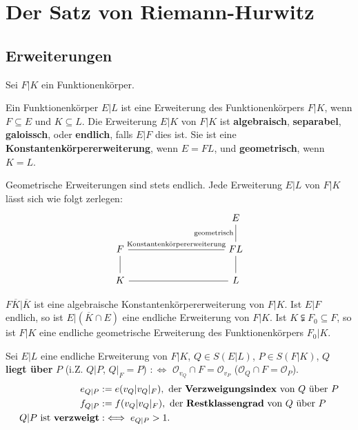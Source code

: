 \chapter{Der Satz von Riemann-Hurwitz}

\section{Erweiterungen}
Sei $F|K$ ein Funktionenkörper.

\begin{definition}
    Ein Funktionenkörper $E|L$ ist eine Erweiterung des Funktionenkörpers $F|K$, wenn $F \subseteq E$ und $K \subseteq L$.
    Die Erweiterung $E|K$ von $F|K$ ist \textbf{algebraisch}, \textbf{separabel}, \textbf{galoissch}, oder \textbf{endlich}, falls
    $E|F$ dies ist. Sie ist eine \textbf{Konstantenkörpererweiterung}, wenn $E = FL$, und \textbf{geometrisch}, wenn $K=L$.
\end{definition}

\begin{bemerkungnr}
    Geometrische Erweiterungen sind stets endlich. Jede Erweiterung $E|L$ von $F|K$ lässt sich wie folgt zerlegen:
    $$\begin{tikzcd}[column sep=10em]
          & E\\
        F \rar[dash]{\text{Konstantenkörpererweiterung}} & FL \uar[dash]{\text{geometrisch}}\\
        K \rar[dash] \uar[dash] & L \uar[dash]
    \end{tikzcd}$$
\end{bemerkungnr}

\begin{beispiel}
    $F\overline{K}|\overline{K}$ ist eine algebraische Konstantenkörpererweiterung von $F|K$.
    Ist $E|F$ endlich, so ist $E|(\overline{K}\cap E)$ eine endliche Erweiterung von $F|K$.
    Ist $K \subsetneqq F_0 \subseteq F$, so ist $F|K$ eine endliche geometrische Erweiterung des Funktionenkörpers $F_0|K$.
\end{beispiel}

\begin{definition}
    Sei $E|L$ eine endliche Erweiterung von $F|K$, $Q \in S(E|L)$, $P \in S(F|K)$, $Q$ \textbf{liegt über} $P$ 
    (i.Z. $Q|P$, $Q|_F = P$) $: \iff$ $\mathcal{O}_{v_Q} \cap F = \mathcal{O}_{v_P}$ ($\mathcal{O}_Q \cap F = \mathcal{O}_P$).
    \begin{align*}
        e_{Q|P} & := e(v_Q | v_Q|_F), \text{ der \textbf{Verzweigungsindex} von } Q \text{ über } P\\
        f_{Q|P} & := f(v_Q | v_Q|_F), \text{ der \textbf{Restklassengrad} von } Q \text{ über } P\\
        Q|P \text{ ist \textbf{verzweigt}} & :\iff e_{Q|P} > 1.
    \end{align*}
\end{definition}

